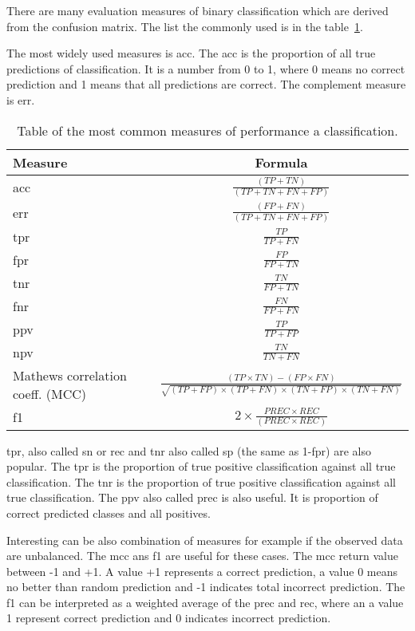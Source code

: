 \documentclass[thesis=M,english]{FITthesis}[2012/10/20]
\begin{document}
There are many evaluation measures of binary classification which are derived from the confusion matrix. The list the commonly used is in the table~\ref{tab:measures}.\cite[4]{Saito2015rocprc}

The most widely used measures is \gls{acc}.\cite[4]{Saito2015rocprc} The \gls{acc} is the proportion of all true predictions of classification. It is a number from 0 to 1, where 0 means no correct prediction and 1 means that all predictions are correct. The complement measure is \gls{err}.

{\renewcommand{\arraystretch}{1.7}%
\begin{table}[H]\centering
    \begin{small}
        \caption{Table of the most common measures of performance a classification.}\label{tab:measures}
        \begin{tabular}{|l|c|}\hline
    Measure & Formula \tabularnewline \hline \hline
        \gls{acc} & $\frac{(TP + TN)}{(TP + TN + FN + FP)}$ \tabularnewline \hline 
        \gls{err} & $\frac{(FP + FN)}{(TP + TN + FN + FP)}$\tabularnewline \hline
        \gls{tpr} & $\frac{TP}{TP+FN}$\tabularnewline \hline
        \gls{fpr} & $\frac{FP}{FP+TN}$\tabularnewline \hline
        \gls{tnr}& $\frac{TN}{FP+TN}$ \tabularnewline \hline
        \gls{fnr} & $\frac{FN}{FP+FN}$\tabularnewline \hline
        \gls{ppv} & $\frac{TP}{TP+FP}$\tabularnewline \hline
        \gls{npv} & $\frac{TN}{TN+FN}$\tabularnewline \hline
        Mathews correlation coeff. (MCC) & $\frac{(TP \times TN) - (FP \times FN)}{\sqrt{(TP + FP)\times(TP + FN)\times(TN + FP)\times(TN + FN)}}$\tabularnewline \hline
        \gls{f1} &  $2 \times \frac{PREC \times REC}{(PREC \times REC)}$ \tabularnewline \hline
        \end{tabular}
    \end{small}
\end{table}}

\gls{tpr}, also called \gls{sn} or \gls{rec} and \gls{tnr} also called \gls{sp} (the same as 1-\gls{fpr}) are also popular.\cite[4]{Saito2015rocprc} The \gls{tpr} is the proportion of true positive classification against all true classification. The \gls{tnr} is the proportion of true positive classification against all true classification. The \gls{ppv} also called \gls{prec} is also useful. It is proportion of correct predicted classes and all positives.

Interesting can be also combination of measures for example if the observed data are unbalanced. The \gls{mcc} ans \gls{f1} are useful for these cases.\cite[4]{Saito2015rocprc} The \gls{mcc} return value between -1 and +1. A value +1 represents a correct prediction, a value 0 means no better than random prediction and -1 indicates total incorrect prediction. The \gls{f1} can be interpreted as a weighted average of the \gls{prec} and \gls{rec}, where an a value 1 represent correct prediction and 0 indicates incorrect prediction. 
\end{document}
